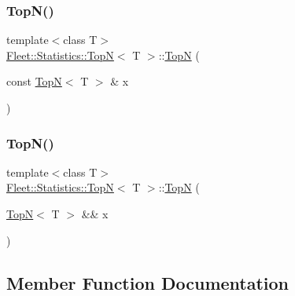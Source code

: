 \mbox{\label{class_fleet_1_1_statistics_1_1_top_n_a3c7b5c9c3fd6e171a0b2d6b1f48cddf3}} 
\subsubsection{\texorpdfstring{Top\+N()}{TopN()}\hspace{0.1cm}{\footnotesize\ttfamily [2/3]}}
{\footnotesize\ttfamily template$<$class T$>$ \\
\hyperlink{class_fleet_1_1_statistics_1_1_top_n}{Fleet\+::\+Statistics\+::\+TopN}$<$ T $>$\+::\hyperlink{class_fleet_1_1_statistics_1_1_top_n}{TopN} (\begin{DoxyParamCaption}\item[{const \hyperlink{class_fleet_1_1_statistics_1_1_top_n}{TopN}$<$ T $>$ \&}]{x }\end{DoxyParamCaption})\hspace{0.3cm}{\ttfamily [inline]}}

\mbox{\label{class_fleet_1_1_statistics_1_1_top_n_af1a27643fa0841afaa7e8ca0e87d9a49}} 
\subsubsection{\texorpdfstring{Top\+N()}{TopN()}\hspace{0.1cm}{\footnotesize\ttfamily [3/3]}}
{\footnotesize\ttfamily template$<$class T$>$ \\
\hyperlink{class_fleet_1_1_statistics_1_1_top_n}{Fleet\+::\+Statistics\+::\+TopN}$<$ T $>$\+::\hyperlink{class_fleet_1_1_statistics_1_1_top_n}{TopN} (\begin{DoxyParamCaption}\item[{\hyperlink{class_fleet_1_1_statistics_1_1_top_n}{TopN}$<$ T $>$ \&\&}]{x }\end{DoxyParamCaption})\hspace{0.3cm}{\ttfamily [inline]}}



\subsection{Member Function Documentation}
\mbox{\label{class_fleet_1_1_statistics_1_1_top_n_a71f34724832a34c029bfeeb6e1dea24f}} 
